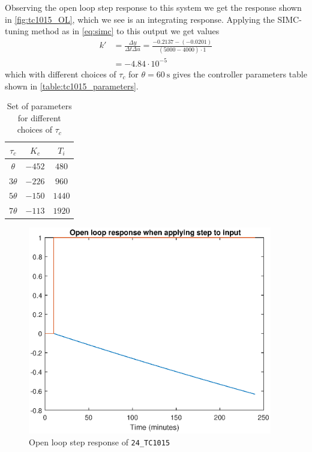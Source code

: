 Observing the open loop step response to this system we get the response shown in \autoref{fig:tc1015_OL}, which we see is an integrating response. Applying the SIMC-tuning method as in \autoref{eq:simc} to this output we get values
\begin{equation}
	\begin{aligned}
		k' &= \frac{\Delta y}{\Delta t \Delta u} = \frac{-0.2137-(-0.0201)}{(5000-4000)\cdot 1} \\
		&= -4.84\cdot 10^{-5}
	\end{aligned}
\end{equation}
which with different choices of $\tau_c$ for $\theta = \SI{60}{\second}$ gives the controller parameters table shown in \autoref{table:tc1015_parameters}.

\begin{table}[h]
	\caption{Set of parameters for different choices of $\tau_c$}
	\label{table:tc1015_parameters}
	\begin{center}
	\begin{tabular}{|c|c|c|}
	\hline
	$\tau_c$ & $K_c$ & $T_i$ \\
	\hline
	$\theta$ & $-452$ & $480$\\
	$3\theta$ & $-226$ & $960$\\
	$5\theta$ & $-150$ & $1440$\\
	$7\theta$ & $-113$ & $1920$\\
	\hline
	\end{tabular}
	\end{center}
\end{table}

\begin{figure}[ht!]
	\centering
	\includegraphics[width=0.95\textwidth]{fig/identification/tc1015_OL.eps}
	\caption{Open loop step response of \texttt{24\_TC1015}}
	\label{fig:tc1015_OL}
\end{figure}


